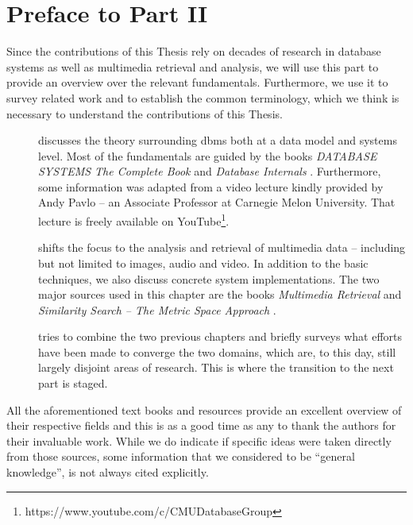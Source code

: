 \chapter*{Preface to Part II}

Since the contributions of this Thesis rely on decades of research in database systems as well as multimedia retrieval and analysis, we will use this part to provide an overview over the relevant fundamentals. Furthermore, we use it to survey related work and to establish the common terminology, which we think is necessary to understand the contributions of this Thesis.

\begin{description}
    \item[]  discusses the theory surrounding \acrlong{dbms} both at a data model and systems level. Most of the fundamentals are guided by the books \emph{DATABASE SYSTEMS The Complete Book} \cite{Garcia:2009Database} and \emph{Database Internals} \cite{Petrov:2019Database}. Furthermore, some information was adapted from a video lecture kindly provided by Andy Pavlo -- an Associate Professor at Carnegie Melon University. That lecture is freely available on YouTube\footnote{https://www.youtube.com/c/CMUDatabaseGroup}.
    \item[] shifts the focus to the analysis and retrieval of multimedia data -- including but not limited to images, audio and video. In addition to the basic techniques, we also discuss concrete system implementations. The two major sources used in this chapter are the books \emph{Multimedia Retrieval} \cite{Blanken:2007multimedia} and \emph{Similarity Search -- The Metric Space Approach} \cite{Zezula:2006Similarity}.
    \item[] tries to combine the two previous chapters and briefly surveys what efforts have been made to converge the two domains, which are, to this day, still largely disjoint areas of research. This is where the transition to the next part is staged.
\end{description}

All the aforementioned text books and resources provide an excellent overview of their respective fields and this is as a good time as any to thank the authors for their invaluable work. While we do indicate if specific ideas were taken directly from those sources, some information that we considered to be ``general knowledge'', is not always cited explicitly.